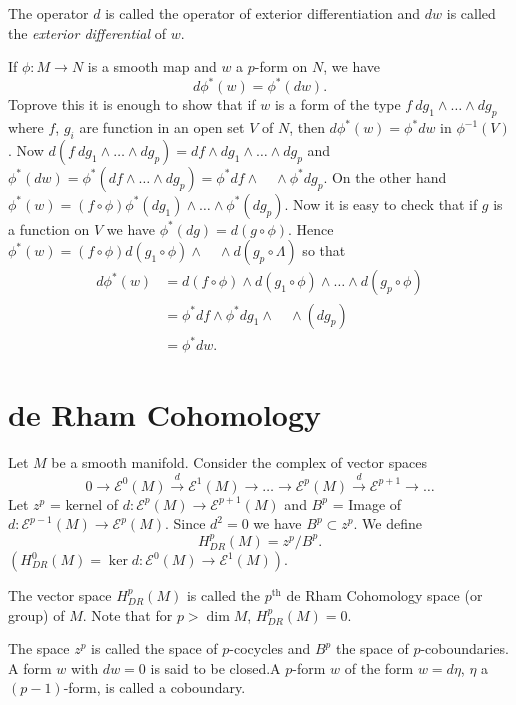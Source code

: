 The operator $d$ is called the operator of exterior differentiation and $dw$ is called the {\em exterior differential} of $w$.

If $\phi:M\to N$ is a smooth map and $w$ a $p$-form on $N$, we have
$$
d\phi^{*}(w)=\phi^{*}(dw).
$$
To\pageoriginale prove this it is enough to show that if $w$ is a form of the type $f \ dg_{1}\wedge\ldots\wedge dg_{p}$ where $f$, $g_{i}$ are function in an open set $V$ of $N$, then $d\phi^{*}(w)=\phi^{*}dw$ in $\phi^{-1}(V)$. Now $d(f\ dg_{1}\wedge\ldots\wedge dg_{p})=df\wedge dg_{1}\wedge\ldots\wedge dg_{p}$ and $\phi^{*}(dw)=\phi^{*}(df\wedge\ldots\wedge dg_{p})=\phi^{*}df\wedge\quad\wedge \phi^{*}dg_{p}$. On the other hand $\phi^{*}(w)=(f\circ \phi)\phi^{*}(dg_{1})\wedge\ldots\wedge \phi^{*}(dg_{p})$. Now it is easy to check that if $g$ is a function on $V$ we have $\phi^{*}(dg)=d(g\circ \phi)$. Hence $\phi^{*}(w)=(f\circ \phi)d(g_{1}\circ\phi)\wedge\quad\wedge d(g_{p}\circ \Lambda)$ so that
\begin{align*}
d\phi^{*}(w) &= d(f\circ\phi)\wedge d(g_{1}\circ\phi)\wedge\ldots\wedge d(g_{p}\circ\phi)\\[3pt]
            &= \phi^{*}df\wedge \phi^{*}dg_{1}\wedge\quad\wedge (dg_{p})\\[3pt]
            &= \phi^{*}dw.
\end{align*}

\section*{de Rham Cohomology}

Let $M$ be a smooth manifold. Consider the complex of vector spaces
$$
0\to \mathscr{E}^{0}(M)\xrightarrow{d}\mathscr{E}^{1}(M)\to\ldots\to \mathscr{E}^{p}(M)\xrightarrow{d}\mathscr{E}^{p+1}\to \ldots
$$
Let $z^{p}$ = kernel of $d:\mathscr{E}^{p}(M)\to \mathscr{E}^{p+1}(M)$ and $B^{p}$ = Image of $d:\mathscr{E}^{p-1}(M)\to \mathscr{E}^{p}(M)$. Since $d^{2}=0$ we have $B^{p}\subset z^{p}$. We define
$$
H^{p}_{DR}(M)=z^{p}/B^{p}.
$$
$(H^{0}_{DR}(M)=\ker d:\mathscr{E}^{0}(M)\to \mathscr{E}^{1}(M))$.

The vector space $H^{p}_{DR}(M)$ is called the $p^{\text{th}}$ de Rham Cohomology space (or group) of $M$. Note that for $p>\dim M$, $H^{p}_{DR}(M)=0$.

The space $z^{p}$ is called the space of $p$-cocycles and $B^{p}$ the space of $p$-coboundaries. A form $w$ with $dw=0$ is said to be closed.\pageoriginale A $p$-form $w$ of the form $w=d\eta$, $\eta$ a $(p-1)$-form, is called a coboundary.

